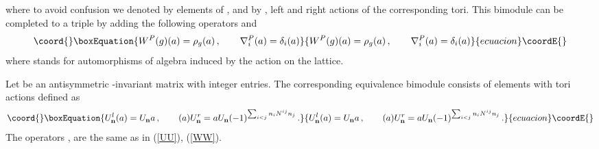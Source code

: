 \documentclass[a4paper,a4paper]{article}
\begin{document}
{where to avoid confusion we denoted by \coordHE{} elements of \coordHE{}, and by \coordHE{}, \coordHE{} left 
and right actions of the corresponding tori. 
This bimodule can be completed to a triple by adding the following operators \coordHE{} and \coordHE{}
\begin{equation}\coord{}\boxEquation{ \label{WW}
W^{P}(g) (a) = \rho_g(a) \, , \qquad \nabla^{P}_{i}(a) = \delta_{i}(a)
}{ W^{P}(g) (a) = \rho_g(a) \, , \qquad \nabla^{P}_{i}(a) = \delta_{i}(a)
}{ecuacion}\coordE{}\end{equation}
where \coordHE{} stands for automorphisms of algebra \coordHE{} induced by the action 
\coordHE{} on the lattice. 


Let \coordHE{} be an antisymmetric \coordHE{}-invariant matrix with integer entries. The corresponding \coordHE{} 
equivalence bimodule consists of elements \coordHE{} with tori actions defined as 
\begin{equation}\coord{}\boxEquation{
U_{\bf n}^{l}(a) = U_{\bf n}a \, , \qquad (a)U^{r}_{\bf n}= aU_{\bf n}(-1)^{\sum_{i<j}n_{i}N^{ij}n_{j}} \, .
}{
U_{\bf n}^{l}(a) = U_{\bf n}a \, , \qquad (a)U^{r}_{\bf n}= aU_{\bf n}(-1)^{\sum_{i<j}n_{i}N^{ij}n_{j}} \, .
}{ecuacion}\coordE{}\end{equation}  
The operators  \coordHE{}, \coordHE{} are the same as in (\ref{UU}), (\ref{WW}). 


}
\end{document}
